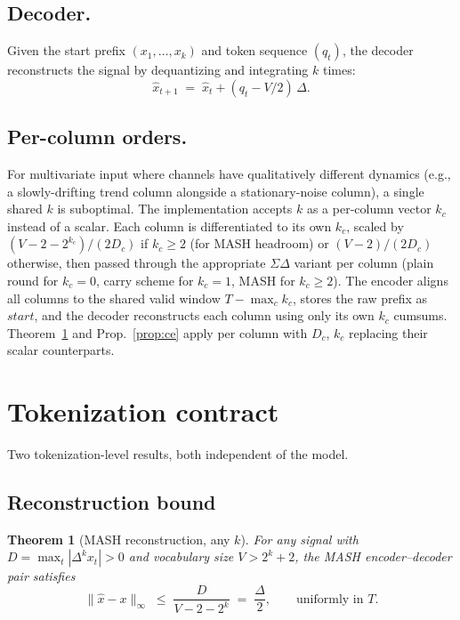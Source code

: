 \documentclass[11pt]{article}
\newtheorem{theorem}{Theorem}
\theoremstyle{remark}
\begin{document}
\subsection{Decoder.}
Given the start prefix $(x_1, \ldots, x_k)$ and token sequence $(q_t)$,
the decoder reconstructs the signal by dequantizing and integrating
$k$ times:
\begin{equation}
\hat x_{t+1} \;=\; \hat x_t + (q_t - V/2)\,\Delta.
\end{equation}

\subsection{Per-column orders.}
For multivariate input where channels have qualitatively different
dynamics (e.g., a slowly-drifting trend column alongside a
stationary-noise column), a single shared $k$ is suboptimal. The
implementation accepts $k$ as a per-column vector $k_c$ instead of a
scalar. Each column is differentiated to its own $k_c$, scaled by
$(V - 2 - 2^{k_c}) / (2 D_c)$ if $k_c \ge 2$ (for MASH headroom) or
$(V - 2) / (2 D_c)$ otherwise, then passed through the appropriate
$\Sigma\Delta$ variant per column (plain round for $k_c = 0$, carry
scheme for $k_c = 1$, MASH for $k_c \ge 2$). The encoder aligns all columns to
the shared valid window $T - \max_c k_c$, stores the raw prefix as
$start$, and the decoder reconstructs each column using only its own
$k_c$ cumsums. Theorem~\ref{thm:recon} and Prop.~\ref{prop:ce} apply
per column with $D_c$, $k_c$ replacing their scalar counterparts.

\section{Tokenization contract}
\label{sec:theory}

Two tokenization-level results, both independent of the model.

\subsection{Reconstruction bound}

\begin{theorem}[MASH reconstruction, any $k$]
\label{thm:recon}
For any signal with $D = \max_t |\Delta^k x_t| > 0$ and vocabulary size
$V > 2^k + 2$, the MASH encoder--decoder pair satisfies
\begin{equation}
\|\hat x - x\|_\infty \;\le\; \frac{D}{V - 2 - 2^k} \;=\; \frac{\Delta}{2},
\qquad \text{uniformly in } T.
\end{equation}
\end{theorem}
\end{document}
